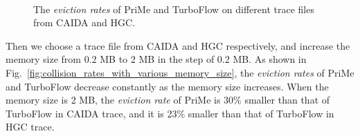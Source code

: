 \documentclass[10pt, conference, letterpaper]{IEEEtran}
\begin{document}
\begin{figure}[t]
	\centering
	\mbox{
	}
	\caption{The \emph{eviction rates} of PriMe and TurboFlow on different trace files from CAIDA and HGC.}
	\label{fig:collision_rates_on_various_trace_files}
\end{figure} 

Then we choose a trace file from CAIDA and HGC respectively, and increase the memory size from 0.2 MB to 2 MB in the step of 0.2 MB. As shown in Fig.~\ref{fig:collision_rates_with_various_memory_size}, the \emph{eviction rates} of PriMe and TurboFlow decrease constantly as the memory size increases. When the memory size is 2 MB, the \emph{eviction rate} of PriMe is 30\% smaller than that of TurboFlow in CAIDA trace, and it is 23\% smaller than that of TurboFlow in HGC trace.
\end{document}

